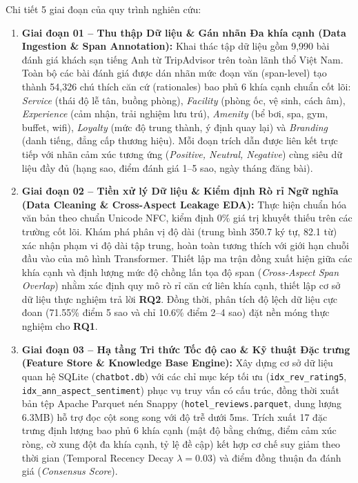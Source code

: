 \documentclass[pdflatex,sn-mathphys-num]{sn-jnl}
\theoremstyle{thmstyleone}
\theoremstyle{thmstyletwo}
\theoremstyle{thmstylethree}
\begin{document}
Chi tiết 5 giai đoạn của quy trình nghiên cứu:
\begin{enumerate}
    \item \textbf{Giai đoạn 01 -- Thu thập Dữ liệu \& Gán nhãn Đa khía cạnh (Data Ingestion \& Span Annotation):} Khai thác tập dữ liệu gồm 9,990 bài đánh giá khách sạn tiếng Anh từ TripAdvisor trên toàn lãnh thổ Việt Nam. Toàn bộ các bài đánh giá được dán nhãn mức đoạn văn (span-level) tạo thành 54,326 chú thích căn cứ (rationales) bao phủ 6 khía cạnh chuẩn cốt lõi: \textit{Service} (thái độ lễ tân, buồng phòng), \textit{Facility} (phòng ốc, vệ sinh, cách âm), \textit{Experience} (cảm nhận, trải nghiệm lưu trú), \textit{Amenity} (bể bơi, spa, gym, buffet, wifi), \textit{Loyalty} (mức độ trung thành, ý định quay lại) và \textit{Branding} (danh tiếng, đẳng cấp thương hiệu). Mỗi đoạn trích dẫn được liên kết trực tiếp với nhãn cảm xúc tương ứng (\textit{Positive, Neutral, Negative}) cùng siêu dữ liệu đầy đủ (hạng sao, điểm đánh giá 1--5 sao, ngày tháng đăng bài).
    
    \item \textbf{Giai đoạn 02 -- Tiền xử lý Dữ liệu \& Kiểm định Rò rỉ Ngữ nghĩa (Data Cleaning \& Cross-Aspect Leakage EDA):} Thực hiện chuẩn hóa văn bản theo chuẩn Unicode NFC, kiểm định 0\% giá trị khuyết thiếu trên các trường cốt lõi. Khám phá phân vị độ dài (trung bình 350.7 ký tự, 82.1 từ) xác nhận phạm vi độ dài tập trung, hoàn toàn tương thích với giới hạn chuỗi đầu vào của mô hình Transformer. Thiết lập ma trận đồng xuất hiện giữa các khía cạnh và định lượng mức độ chồng lấn tọa độ span (\textit{Cross-Aspect Span Overlap}) nhằm xác định quy mô rò rỉ căn cứ liên khía cạnh, thiết lập cơ sở dữ liệu thực nghiệm trả lời \textbf{RQ2}. Đồng thời, phân tích độ lệch dữ liệu cực đoan (71.55\% điểm 5 sao và chỉ 10.6\% điểm 2--4 sao) đặt nền móng thực nghiệm cho \textbf{RQ1}.
    
    \item \textbf{Giai đoạn 03 -- Hạ tầng Tri thức Tốc độ cao \& Kỹ thuật Đặc trưng (Feature Store \& Knowledge Base Engine):} Xây dựng cơ sở dữ liệu quan hệ SQLite (\texttt{chatbot.db}) với các chỉ mục kép tối ưu (\texttt{idx\_rev\_rating5}, \texttt{idx\_ann\_aspect\_sentiment}) phục vụ truy vấn có cấu trúc, đồng thời xuất bản tệp Apache Parquet nén Snappy (\texttt{hotel\_reviews.parquet}, dung lượng 6.3MB) hỗ trợ đọc cột song song với độ trễ dưới 5ms. Trích xuất 17 đặc trưng định lượng bao phủ 6 khía cạnh (mật độ bằng chứng, điểm cảm xúc ròng, cờ xung đột đa khía cạnh, tỷ lệ đề cập) kết hợp cơ chế suy giảm theo thời gian (Temporal Recency Decay $\lambda = 0.03$) và điểm đồng thuận đa đánh giá (\textit{Consensus Score}).
    

\end{enumerate}
\end{document}
